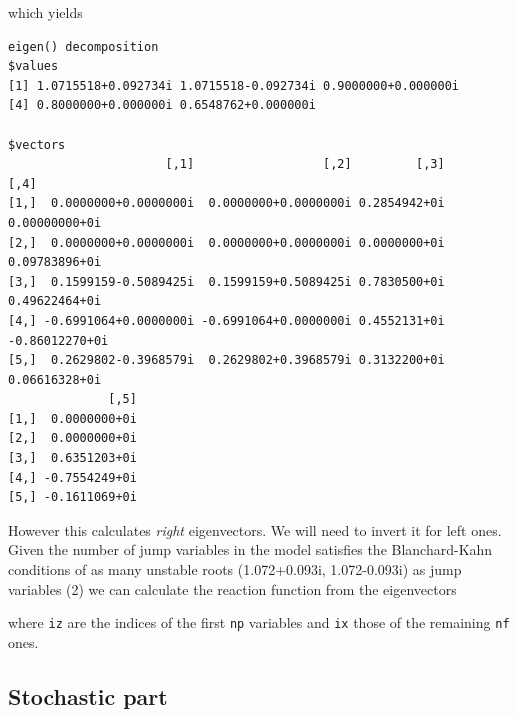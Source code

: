 \documentclass[
  letterpaper,
]{book}
\newenvironment{Shaded}{\begin{snugshade}}{\end{snugshade}}
\newcommand{\CommentTok}[1]{\textcolor[rgb]{0.37,0.37,0.37}{#1}}
\newcommand{\DecValTok}[1]{\textcolor[rgb]{0.68,0.00,0.00}{#1}}
\newcommand{\FunctionTok}[1]{\textcolor[rgb]{0.28,0.35,0.67}{#1}}
\newcommand{\NormalTok}[1]{\textcolor[rgb]{0.00,0.23,0.31}{#1}}
\newcommand{\OtherTok}[1]{\textcolor[rgb]{0.00,0.23,0.31}{#1}}
\newcommand{\SpecialCharTok}[1]{\textcolor[rgb]{0.37,0.37,0.37}{#1}}
\begin{document}
which yields

\begin{verbatim}
eigen() decomposition
$values
[1] 1.0715518+0.092734i 1.0715518-0.092734i 0.9000000+0.000000i
[4] 0.8000000+0.000000i 0.6548762+0.000000i

$vectors
                      [,1]                  [,2]         [,3]           [,4]
[1,]  0.0000000+0.0000000i  0.0000000+0.0000000i 0.2854942+0i  0.00000000+0i
[2,]  0.0000000+0.0000000i  0.0000000+0.0000000i 0.0000000+0i  0.09783896+0i
[3,]  0.1599159-0.5089425i  0.1599159+0.5089425i 0.7830500+0i  0.49622464+0i
[4,] -0.6991064+0.0000000i -0.6991064+0.0000000i 0.4552131+0i -0.86012270+0i
[5,]  0.2629802-0.3968579i  0.2629802+0.3968579i 0.3132200+0i  0.06616328+0i
              [,5]
[1,]  0.0000000+0i
[2,]  0.0000000+0i
[3,]  0.6351203+0i
[4,] -0.7554249+0i
[5,] -0.1611069+0i
\end{verbatim}

However this calculates \emph{right} eigenvectors. We will need to
invert it for left ones. Given the number of jump variables in the model
satisfies the Blanchard-Kahn conditions of as many unstable roots
(1.072+0.093i, 1.072-0.093i) as jump variables (2) we can calculate the
reaction function from the eigenvectors

\begin{Shaded}
\end{Shaded}

where \texttt{iz} are the indices of the first \texttt{np} variables and
\texttt{ix} those of the remaining \texttt{nf} ones.

\hypertarget{stochastic-part}{%
\subsection{Stochastic part}\label{stochastic-part}}
\end{document}
